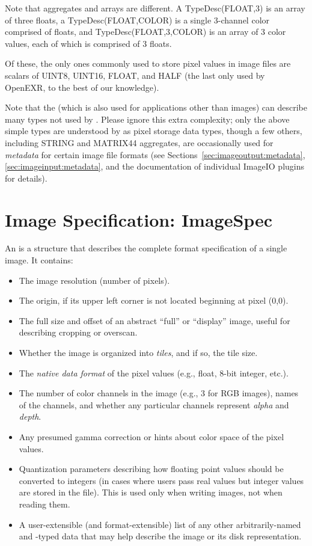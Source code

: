 Note that aggregates and arrays are different.  A {\cf
  TypeDesc(FLOAT,3)} is an array of three floats, a {\cf
  TypeDesc(FLOAT,COLOR)} is a single 3-channel color comprised of
floats, and {\cf TypeDesc(FLOAT,3,COLOR)} is an array of 3 color values,
each of which is comprised of 3 floats.
\apiend

\bigskip

Of these, the only ones commonly used to store pixel values in image files
are scalars of {\cf UINT8}, {\cf UINT16}, {\cf FLOAT}, and {\cf HALF}
(the last only used by OpenEXR, to the best of our knowledge).

Note that the \TypeDesc (which is also used for applications other
than images) can describe many types not used by
\product.  Please ignore this extra complexity; only the above simple types are understood by
\product as pixel storage data types, though a few others, including
{\cf STRING} and {\cf MATRIX44} aggregates, are occasionally used for
\emph{metadata} for certain image file formats (see
Sections~\ref{sec:imageoutput:metadata}, \ref{sec:imageinput:metadata},
and the documentation of individual ImageIO plugins for details).

\section{Image Specification: {\cf ImageSpec}}
\label{sec:ImageSpec}

An \ImageSpec is a structure that describes the complete
format specification of a single image.  It contains:

\begin{itemize}
\item The image resolution (number of pixels).
\item The origin, if its upper left corner is not located beginning at
  pixel (0,0).
\item The full size and offset of an abstract ``full'' or ``display''
  image, useful for describing cropping or overscan.
\item Whether the image is organized into \emph{tiles}, and if so, the
  tile size.
\item The \emph{native data format} of the pixel values (e.g., float, 8-bit
  integer, etc.).
\item The number of color channels in the image (e.g., 3 for RGB
  images), names of the channels, and whether any particular channels
  represent \emph{alpha} and \emph{depth}.
\item Any presumed gamma correction or hints about color space of
  the pixel values.
\item Quantization parameters describing how floating point values
  should be converted to integers (in cases where users pass real values
  but integer values are stored in the file).  This is used only when
  writing images, not when reading them.
\item A user-extensible (and format-extensible) list of any other
  arbitrarily-named and -typed data that may help describe the image or
  its disk representation.
\end{itemize}

